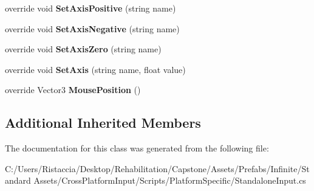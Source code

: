 \begin{DoxyCompactItemize}
\item 
\mbox{\label{class_unity_standard_assets_1_1_cross_platform_input_1_1_platform_specific_1_1_standalone_input_a045d6d8118178037cca1552c087f4598}} 
override void {\bfseries Set\+Axis\+Positive} (string name)
\item 
\mbox{\label{class_unity_standard_assets_1_1_cross_platform_input_1_1_platform_specific_1_1_standalone_input_ab657b9df7411909f1319c7ecf918689c}} 
override void {\bfseries Set\+Axis\+Negative} (string name)
\item 
\mbox{\label{class_unity_standard_assets_1_1_cross_platform_input_1_1_platform_specific_1_1_standalone_input_a94bfadda9797a34c9d66b30dd6449c2c}} 
override void {\bfseries Set\+Axis\+Zero} (string name)
\item 
\mbox{\label{class_unity_standard_assets_1_1_cross_platform_input_1_1_platform_specific_1_1_standalone_input_a1597873a4a9309a388a3e9239e2632d7}} 
override void {\bfseries Set\+Axis} (string name, float value)
\item 
\mbox{\label{class_unity_standard_assets_1_1_cross_platform_input_1_1_platform_specific_1_1_standalone_input_a18dc43a362728639b76870ef6e141576}} 
override Vector3 {\bfseries Mouse\+Position} ()
\end{DoxyCompactItemize}
\subsection*{Additional Inherited Members}


The documentation for this class was generated from the following file\+:\begin{DoxyCompactItemize}
\item 
C\+:/\+Users/\+Ristaccia/\+Desktop/\+Rehabilitation/\+Capstone/\+Assets/\+Prefabs/\+Infinite/\+Standard Assets/\+Cross\+Platform\+Input/\+Scripts/\+Platform\+Specific/Standalone\+Input.\+cs\end{DoxyCompactItemize}
